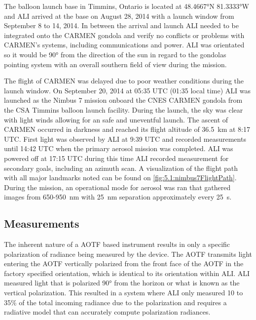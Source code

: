 \documentclass[12pt]{article}
\begin{document}
The balloon launch base in Timmins, Ontario is located at 48.4667\si{\degree}N 81.3333\si{\degree}W and ALI arrived at the base on August 28, 2014 with a launch window from September 8 to 14, 2014. In between the arrival and launch ALI needed to be integrated onto the CARMEN gondola and verify no conflicts or problems with CARMEN's systems, including communications and power. ALI was orientated so it would be 90\si{\degree} from the direction of the sun in regard to the gondolas pointing system with an overall southern field of view during the mission.

The flight of CARMEN was delayed due to poor weather conditions during the launch window. On September 20, 2014 at 05:35 UTC (01:35 local time) ALI was launched as the Nimbus 7 mission onboard the CNES CARMEN gondola from the CSA Timmins balloon launch facility. During the launch, the sky was clear with light winds allowing for an safe and uneventful launch. The ascent of CARMEN occurred in darkness and reached its flight altitude of 36.5~km at 8:17 UTC. First light was observed by ALI at 9:39 UTC and recorded measurements until 14:42 UTC when the primary aerosol mission was completed. ALI was powered off at 17:15 UTC during this time  ALI recorded measurement for secondary goals, including an azimuth scan. A visualization of the flight path with all major landmarks noted can be found on \autoref{fig:5.1:nimbus7FlightPath}. During the mission, an operational mode for aerosol was ran that gathered images from 650-950~nm with 25~nm separation approximately every 25~s.%

\subsection{Measurements}

The inherent nature of a AOTF based instrument results in only a specific polarization of radiance being measured by the device. The AOTF transmits light entering the AOTF vertically polarized from the front face of the AOTF in the factory specified orientation, which is identical to its orientation within ALI. ALI measured light that is polarized 90\si{\degree} from the horizon or what is known as the vertical polarization. This resulted in a system where ALI only measured 10 to 35\% of the total incoming radiance due to the polarization and requires a radiative model that can accurately compute polarization radiances.
\end{document}

